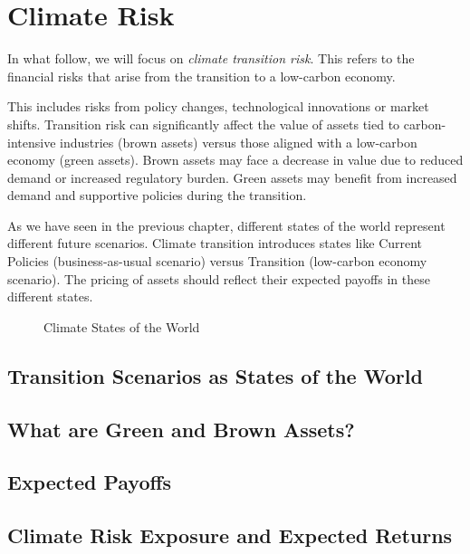 \chapter{Climate Risk}

In what follow, we will focus on \textit{climate transition risk}. 
This refers to the financial risks that arise from the transition 
to a low-carbon economy. 

This includes risks from policy changes, technological innovations or 
market shifts. Transition risk can significantly 
affect the value of assets tied to carbon-intensive industries 
(brown assets) versus those aligned with a low-carbon economy (green assets).
Brown assets may face a decrease in value 
due to reduced demand or increased regulatory burden.
Green assets may benefit from increased demand and supportive 
policies during the transition.

As we have seen in the previous chapter, 
different states of the world represent different future 
scenarios. Climate transition introduces states 
like Current Policies (business-as-usual scenario) versus
Transition (low-carbon economy scenario). The pricing of assets 
should reflect their expected payoffs in these different states.

\begin{figure}[htbp]
    \centering
    \caption{Climate States of the World}
    \label{fig:climate_risk}
\end{figure}

\section{Transition Scenarios as States of the World}

\section{What are Green and Brown Assets?}

\section{Expected Payoffs}

\section{Climate Risk Exposure and Expected Returns}